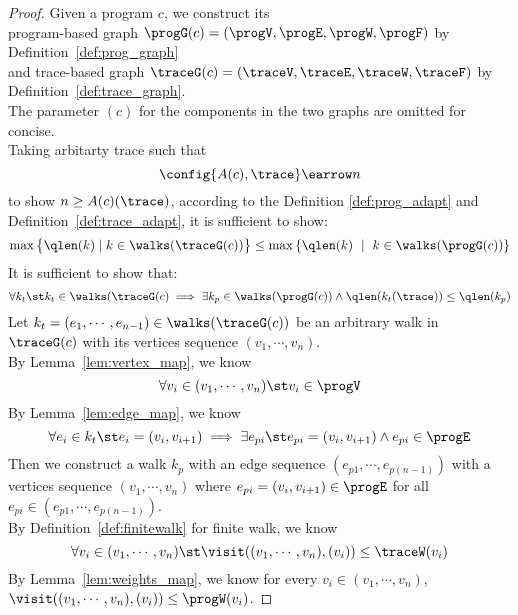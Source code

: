 \begin{proof}
Given a program ${c}$, 
we construct its 
\\
program-based graph $\progG({c}) = (\progV, \progE, \progW, \progF)$
by Definition~\ref{def:prog_graph}
\\ and 
trace-based graph $\traceG({c}) = (\traceV, \traceE, \traceW, \traceF)$  by Definition~\ref{def:trace_graph}.
\\
The parameter $(c)$ for the components in the two graphs are omitted for concise.
\\
Taking arbitarty trace such that 
\[ 
\config{A(c), \trace} \earrow n\]
to show $n \geq A(c)(\trace)$, 
according to the Definition \ref{def:prog_adapt} and Definition~\ref{def:trace_adapt}, it is sufficient to show:
%
$$
\max \big 
\{ \qlen(k) \mid k \in \walks(\traceG(c)) \big \} 
\leq
\max\left\{ \qlen(k) \ \mid \  k\in \walks(\progG({c}))\right \}
$$
%
%
It is sufficient to show that:
\[
  \forall k_t \st 
  k_t \in \walks(\traceG({c}) \implies
  \exists k_p \in \walks(\progG({c})) \land 
  \qlen(k_t(\trace)) \leq \qlen(k_p)
\]
%
Let $k_t = (e_1, \cdots, e_{n-1}) \in \walks(\traceG(c))$ be an arbitrary walk in $\traceG(c)$ with its vertices sequence 
$(v_1, \cdots, v_n)$.
\\
By Lemma~\ref{lem:vertex_map},
we know 
\[
  \forall v_i \in (v_1, \cdots, v_n) \st v_i \in \progV
  \]
%
By Lemma~\ref{lem:edge_map}, we know
%
\[
  \forall e_i \in k_t \st e_i = (v_i, v_{i + 1}) \implies
  \exists e_{pi} \st e_{pi} = (v_i, v_{i + 1}) \land e_{pi} \in \progE
  \]
Then we construct a walk $k_p$ with an edge sequence $(e_{p1}, \cdots, e_{p(n-1)}) $ 
with a vertices sequence $(v_1, \cdots, v_n)$ where 
$e_{pi} = (v_i, v_{i + 1}) \in \progE$ for all $e_{pi} \in (e_{p1}, \cdots, e_{p(n-1)})$.
\\
By Definition~\ref{def:finitewalk} for finite walk, 
we know
\[
  \forall v_i \in (v_1, \cdots, v_n) \st
  \visit((v_1, \cdots, v_n), (v_i)) \leq \traceW(v_i)
\]
%
By Lemma~\ref{lem:weights_map}, we know for every $ v_i \in (v_1, \cdots, v_n)$,
$\visit((v_1, \cdots, v_n), (v_i)) \leq \progW(v_i)$.

\end{proof}
